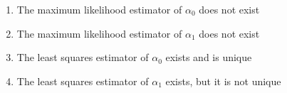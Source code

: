 \documentclass[journal]{IEEEtran}
\begin{document}
\begin{enumerate}
\begin{enumerate}
    \item The maximum likelihood estimator of $ \alpha_0 $ does not exist
    \item The maximum likelihood estimator of $ \alpha_1 $ does not exist
    \item The least squares estimator of $ \alpha_0 $ exists and is unique
    \item The least squares estimator of $ \alpha_1 $ exists, but it is not unique
\end{enumerate}


 \end{enumerate}
 
\end{document}
